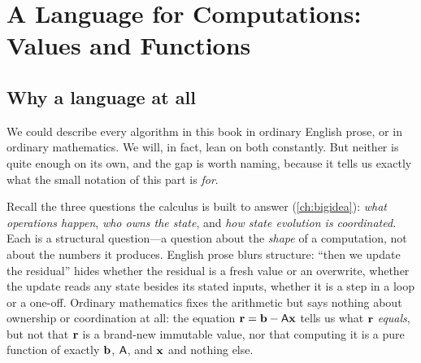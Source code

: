 \chapter{A Language for Computations: Values and Functions}
\label{ch:language}


\section{Why a language at all}

We could describe every algorithm in this book in ordinary English prose, or in
ordinary mathematics. We will, in fact, lean on both constantly. But neither is
quite enough on its own, and the gap is worth naming, because it tells us exactly
what the small notation of this part is \emph{for}.

Recall the three questions the calculus is built to answer
(\cref{ch:bigidea}): \emph{what operations happen}, \emph{who owns the state},
and \emph{how state evolution is coordinated}. Each is a structural question---a
question about the \emph{shape} of a computation, not about the numbers it
produces. English prose blurs structure: ``then we update the residual'' hides
whether the residual is a fresh value or an overwrite, whether the update reads
any state besides its stated inputs, whether it is a step in a loop or a one-off.
Ordinary mathematics fixes the arithmetic but says nothing about ownership or
coordination at all: the equation $\mathbf{r} = \mathbf{b} - \mathsf{A}\mathbf{x}$ tells us what $\mathbf{r}$
\emph{equals}, but not that $\mathbf{r}$ is a brand-new immutable value, nor that
computing it is a pure function of exactly $\mathbf{b}$, $\mathsf{A}$, and $\mathbf{x}$ and
nothing else.

